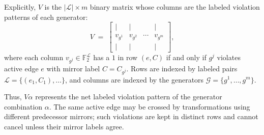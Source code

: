 \noindent Explicitly, $V$ is the $\lvert\mathcal{L}\rvert\times m$ binary matrix whose columns are the labeled violation patterns of each generator:
\[
V \;=\;
\begin{bmatrix}
  \Big| & \Big| & & \Big| \\[4pt]
  v_{g^1} & v_{g^2} & \cdots & v_{g^m} \\[4pt]
  \Big| & \Big| & & \Big|
\end{bmatrix},
\]
where each column $v_{g^j}\in\mathbb{F}_2^{\mathcal{L}}$ has a $1$ in row $(e,C)$ if and only if $g^j$ violates active edge $e$ with mirror label $C=C_{g^j}$.
Rows are indexed by labeled pairs $\mathcal{L}=\{(e_1,C_1),\ldots\}$, and columns are indexed by the generators $\mathcal{G}=\{g^1,\ldots,g^m\}$.

Thus, $V\alpha$ represents the net labeled violation pattern of the generator combination $\alpha$. The same active edge may be crossed by transformations using different predecessor mirrors; such violations are kept in distinct rows and cannot cancel unless their mirror labels agree.
